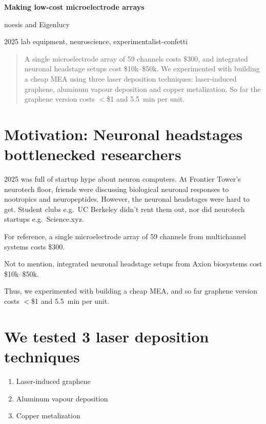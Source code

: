 \documentclass[11pt,letterpaper]{article}
\begin{document}
\begin{center}
  {\LARGE\bfseries Making low-cost microelectrode arrays\par}
  \vspace{0.9em}
  {\large noesis and Eigenlucy\par}
  \vspace{0.3em}
  {\small\color{gray} 2025 \quad\textperiodcentered\quad lab equipment, neuroscience, experimentalist-confetti\par}
\end{center}

\vspace{0.4em}
\begin{quote}
\small
A single microelectrode array of 59 channels costs \$300, and integrated neuronal
headstage setups cost \$10k--\$50k. We experimented with building a cheap MEA using
three laser deposition techniques: laser-induced graphene, aluminum vapour deposition
and copper metalization. So far the graphene version costs $<$\$1 and \SI{5.5}{\minute}
per unit.
\end{quote}
\vspace{0.2em}

\section{Motivation: Neuronal headstages bottlenecked researchers}

2025 was full of startup hype about neuron computers. At Frontier Tower's neurotech
floor, friends were discussing biological neuronal responses to nootropics and
neuropeptides. However, the neuronal headstages were hard to get. Student clubs e.g.\
UC Berkeley didn't rent them out, nor did neurotech startups e.g.\ Science.xyz.

For reference, a single microelectrode array of 59 channels from multichannel systems
costs \$300.

Not to mention, integrated neuronal headstage setups from Axion biosystems cost
\$10k--\$50k.

Thus, we experimented with building a cheap MEA, and so far graphene version costs
$<$\$1 and \SI{5.5}{\minute} per unit.

\section{We tested 3 laser deposition techniques}

\begin{enumerate}
  \item Laser-induced graphene
  \item Aluminum vapour deposition
  \item Copper metalization
\end{enumerate}
\end{document}
